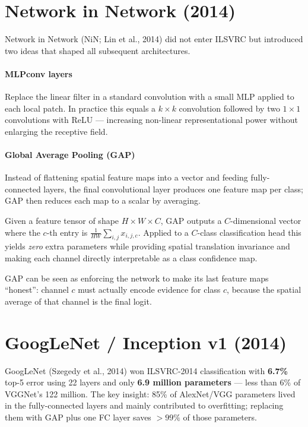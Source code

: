 \documentclass[11pt, oneside]{book}
\begin{document}
\section{Network in Network (2014)}

Network in Network (NiN; Lin et al., 2014) did not enter ILSVRC but introduced two ideas
that shaped all subsequent architectures.

\paragraph{MLPconv layers} Replace the linear filter in a standard convolution
with a small MLP applied to each local patch.
In practice this equals a $k\times k$ convolution followed by two $1\times1$
convolutions with ReLU — increasing non-linear representational power without
enlarging the receptive field.

\paragraph{Global Average Pooling (GAP)} Instead of flattening spatial feature maps
into a vector and feeding fully-connected layers, the final convolutional layer
produces one feature map per class; GAP then reduces each map to a scalar by averaging.

\begin{defbox}[title={Global Average Pooling}]
Given a feature tensor of shape $H \times W \times C$,
GAP outputs a $C$-dimensional vector where the $c$-th entry is
$\frac{1}{HW}\sum_{i,j} x_{i,j,c}$.
Applied to a $C$-class classification head this yields \emph{zero} extra parameters
while providing spatial translation invariance and making each channel directly
interpretable as a class confidence map.
\end{defbox}

\begin{intbox}
GAP can be seen as enforcing the network to make its last feature maps ``honest'':
channel $c$ must actually encode evidence for class $c$, because
the spatial average of that channel is the final logit.
\end{intbox}

\section{GoogLeNet / Inception v1 (2014)}

GoogLeNet (Szegedy et al., 2014) won ILSVRC-2014 classification with
\textbf{6.7\%} top-5 error using 22 layers and only \textbf{6.9 million parameters}
— less than 6\% of VGGNet's 122 million.
The key insight: 85\% of AlexNet/VGG parameters lived in the fully-connected layers
and mainly contributed to overfitting; replacing them with GAP plus one FC layer
saves $> 99\%$ of those parameters.
\end{document}
